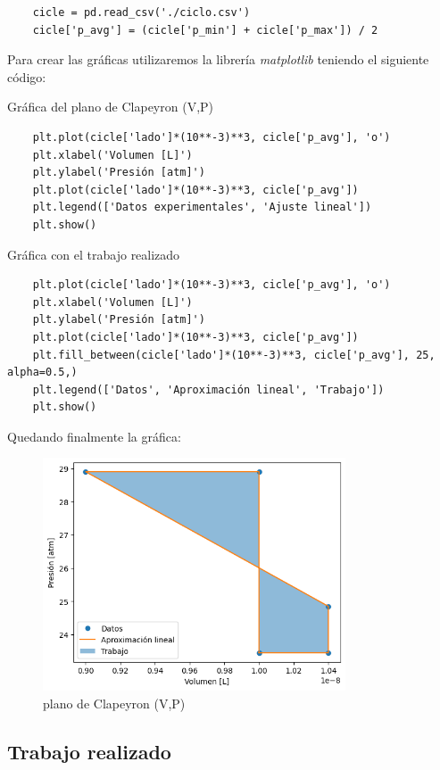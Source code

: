 \documentclass{article}
\begin{document}
\begin{verbatim}
    cicle = pd.read_csv('./ciclo.csv')
    cicle['p_avg'] = (cicle['p_min'] + cicle['p_max']) / 2
\end{verbatim}

Para crear las gráficas utilizaremos la librería \textit{matplotlib} teniendo el siguiente código:

Gráfica del plano de Clapeyron (V,P)

\begin{verbatim}
    plt.plot(cicle['lado']*(10**-3)**3, cicle['p_avg'], 'o')
    plt.xlabel('Volumen [L]')
    plt.ylabel('Presión [atm]')
    plt.plot(cicle['lado']*(10**-3)**3, cicle['p_avg'])
    plt.legend(['Datos experimentales', 'Ajuste lineal'])
    plt.show()
\end{verbatim}

Gráfica con el trabajo realizado

\begin{verbatim}
    plt.plot(cicle['lado']*(10**-3)**3, cicle['p_avg'], 'o')
    plt.xlabel('Volumen [L]')
    plt.ylabel('Presión [atm]')
    plt.plot(cicle['lado']*(10**-3)**3, cicle['p_avg'])
    plt.fill_between(cicle['lado']*(10**-3)**3, cicle['p_avg'], 25, alpha=0.5,)
    plt.legend(['Datos', 'Aproximación lineal', 'Trabajo'])
    plt.show()
\end{verbatim}

Quedando finalmente la gráfica:

\begin{figure}[h]
    \centering
    \includegraphics[width=0.8\textwidth]{cap2}
    \caption{plano de Clapeyron (V,P)}
\end{figure}

\subsection{Trabajo realizado}
\end{document}
